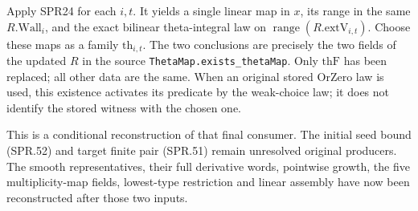 \documentclass[11pt,a4paper]{article}
\numberwithin{equation}{section}
\theoremstyle{remark}\newtheorem{remark}[theorem]{Remark}
\begin{document}
Apply SPR24 for each \(i,t\).  It yields a single linear map in
\(x\), its range in the same \(R.\mathrm{Wall}_i\), and the
exact bilinear theta-integral law on
\(\operatorname{range}(R.\mathrm{extV}_{i,t})\).
Choose these maps as a family \(\mathrm{th}_{i,t}\).
The two conclusions are precisely the two fields of the updated
\(R\) in the source \texttt{ThetaMap.\allowbreak exists\_\allowbreak thetaMap}.
Only \(\mathrm{thF}\) has been replaced; all other data are the
same.  When an original stored \(\mathrm{OrZero}\) law is used,
this existence activates its predicate by the weak-choice law;
it does not identify the stored witness with the chosen one.

This is a conditional reconstruction of that final consumer.
The initial seed bound (SPR.52) and target finite pair (SPR.51)
remain unresolved original producers.  The smooth representatives,
their full derivative words, pointwise growth, the five
multiplicity-map fields, lowest-type restriction and linear
assembly have now been reconstructed after those two inputs.
\end{document}
